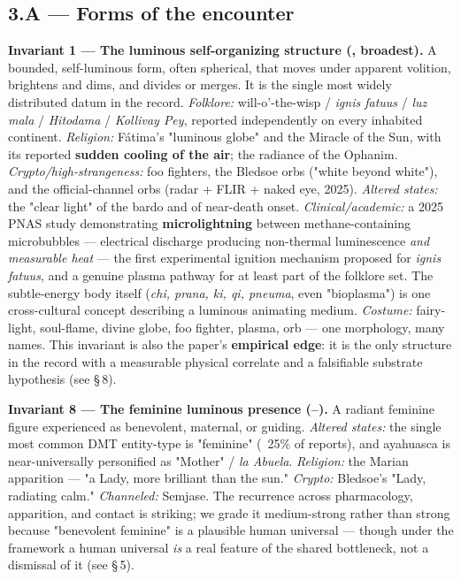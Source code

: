 \documentclass[11pt]{article}
\begin{document}
\subsection*{3.A --- Forms of the encounter}
\textbf{Invariant 1 --- The luminous self-organizing structure (\CIRCLE, broadest).} A bounded, self-luminous form, often spherical, that moves under apparent volition, brightens and dims, and divides or merges. It is the single most widely distributed datum in the record. \emph{Folklore:} will-o'-the-wisp / \emph{ignis fatuus} / \emph{luz mala} / \emph{Hitodama} / \emph{Kollivay Pey}, reported independently on every inhabited continent. \emph{Religion:} Fátima's "luminous globe" and the Miracle of the Sun, with its reported \textbf{sudden cooling of the air}; the radiance of the Ophanim. \emph{Crypto/high-strangeness:} foo fighters, the Bledsoe orbs ("white beyond white"), and the official-channel orbs (radar + FLIR + naked eye, 2025). \emph{Altered states:} the "clear light" of the bardo and of near-death onset. \emph{Clinical/academic:} a 2025 PNAS study demonstrating \textbf{microlightning} between methane-containing microbubbles --- electrical discharge producing non-thermal luminescence \emph{and measurable heat} --- the first experimental ignition mechanism proposed for \emph{ignis fatuus}, and a genuine plasma pathway for at least part of the folklore set. The subtle-energy body itself (\emph{chi, prana, ki, qi, pneuma}, even "bioplasma") is one cross-cultural concept describing a luminous animating medium. \emph{Costume:} fairy-light, soul-flame, divine globe, foo fighter, plasma, orb --- one morphology, many names. This invariant is also the paper's \textbf{empirical edge}: it is the only structure in the record with a measurable physical correlate and a falsifiable substrate hypothesis (see \S\,8).

\textbf{Invariant 8 --- The feminine luminous presence (\LEFTcircle--\CIRCLE).} A radiant feminine figure experienced as benevolent, maternal, or guiding. \emph{Altered states:} the single most common DMT entity-type is "feminine" (~25\% of reports), and ayahuasca is near-universally personified as "Mother" / \emph{la Abuela}. \emph{Religion:} the Marian apparition --- "a Lady, more brilliant than the sun." \emph{Crypto:} Bledsoe's "Lady, radiating calm." \emph{Channeled:} Semjase. The recurrence across pharmacology, apparition, and contact is striking; we grade it medium-strong rather than strong because "benevolent feminine" is a plausible human universal --- though under the framework a human universal \emph{is} a real feature of the shared bottleneck, not a dismissal of it (see \S\,5).
\end{document}
